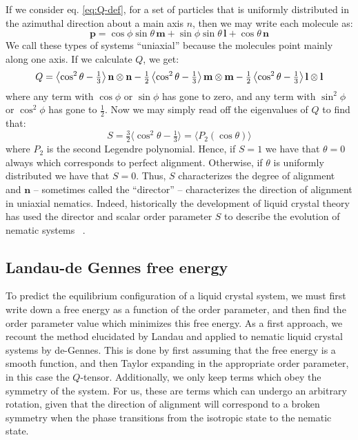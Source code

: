 \documentclass[reqno]{article}
\begin{document}
  If we consider eq. \eqref{eq:Q-def}, for a set of particles that is uniformly
  distributed in the azimuthal direction about a main axis $n$, then we may
  write each molecule as:
  \begin{equation}
    \mathbf{p}
    =
    \cos\phi \sin\theta \, \mathbf{m}
    + \sin\phi \sin\theta \, \mathbf{l}
    + \cos\theta \, \mathbf{n}
  \end{equation}
  We call these types of systems ``uniaxial'' because the molecules point mainly
  along one axis.
  If we calculate $Q$, we get:
  \begin{equation} \label{eq:uniaxial-Q-decomposition}
      Q
      = 
      \left< \cos^2 \theta - \tfrac13 \right> \mathbf{n} \otimes \mathbf{n}
      - \tfrac12 \left< \cos^2\theta - \tfrac13 \right> \mathbf{m} \otimes \mathbf{m}
      - \tfrac12 \left< \cos^2\theta - \tfrac13 \right> \mathbf{l} \otimes \mathbf{l}\\
  \end{equation}
  where any term with $\cos\phi$ or $\sin\phi$ has gone to zero, and any term
  with $\sin^2\phi$ or $\cos^2\phi$ has gone to $\tfrac12$.
  Now we may simply read off the eigenvalues of $Q$ to find that:
  \begin{equation}
    S
    = \tfrac32 \langle \cos^2 \theta - \tfrac13 \rangle
    = \langle P_2(\cos\theta) \rangle
  \end{equation}
  where $P_2$ is the second Legendre polynomial.
  Hence, if $S = 1$ we have that $\theta = 0$ always which corresponds to
  perfect alignment.
  Otherwise, if $\theta$ is uniformly distributed we have that $S = 0$.
  Thus, $S$ characterizes the degree of alignment and $\mathbf{n}$ -- sometimes called
  the ``director'' -- characterizes the direction of alignment in uniaxial
  nematics.
  Indeed, historically the development of liquid crystal theory has used the
  director and scalar order parameter $S$ to describe the evolution of nematic
  systems ~\cite{ericksen_hydrostatic_1962, ericksen_liquid_1991}.
  
  \subsection{Landau-de Gennes free energy}
  To predict the equilibrium configuration of a liquid crystal system, we must
  first write down a free energy as a function of the order parameter, and then
  find the order parameter value which minimizes this free energy.
  As a first approach, we recount the method elucidated by Landau and applied to
  nematic liquid crystal systems by de-Gennes.
  This is done by first assuming that the free energy is a smooth function, and
  then Taylor expanding in the appropriate order parameter, in this case the
  $Q$-tensor.
  Additionally, we only keep terms which obey the symmetry of the system.
  For us, these are terms which can undergo an arbitrary rotation, given that
  the direction of alignment will correspond to a broken symmetry when the phase
  transitions from the isotropic state to the nematic state.
\end{document}
